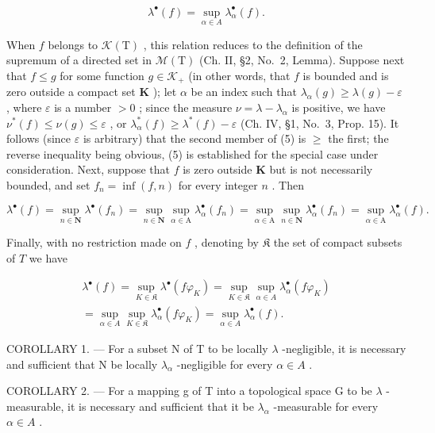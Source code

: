 \[
\lambda^ {\bullet} (f) = \sup _ {\alpha \in A} \lambda_ {\alpha} ^ {\bullet} (f).\tag{5}
\]

When \(f\) belongs to \(\mathcal{K}(\mathrm{T})\) , this relation reduces to the definition of the supremum of a directed set in \(\mathcal{M}(\mathrm{T})\) (Ch. II, §2, No.~2, Lemma). Suppose next that \(f \leqslant g\) for some function \(g \in \mathcal{K}_+\) (in other words, that \(f\) is bounded and is zero outside a compact set \(\mathbf{K}\) ); let \(\alpha\) be an index such that \(\lambda_{\alpha}(g) \geqslant \lambda(g) - \varepsilon\) , where \(\varepsilon\) is a number \(>0\) ; since the measure \(\nu = \lambda - \lambda_{\alpha}\) is positive, we have \(\nu^{*}(f) \leqslant \nu(g) \leqslant \varepsilon\) , or \(\lambda_{\alpha}^{*}(f) \geqslant \lambda^{*}(f) - \varepsilon\) (Ch. IV, §1, No.~3, Prop. 15). It follows (since \(\varepsilon\) is arbitrary) that the second member of (5) is \(\geqslant\) the first; the reverse inequality being obvious, (5) is established for the special case under consideration. Next, suppose that \(f\) is zero outside \(\mathbf{K}\) but is not necessarily bounded, and set \(f_n = \inf(f, n)\) for every integer \(n\) . Then

\[
\lambda^ {\bullet} (f) = \sup _ {n \in \mathbf {N}} \lambda^ {\bullet} (f _ {n}) = \sup _ {n \in \mathbf {N}} \sup _ {\alpha \in \mathrm{A}} \lambda_ {\alpha} ^ {\bullet} (f _ {n}) = \sup _ {\alpha \in \mathrm{A}} \sup _ {n \in \mathbf {N}} \lambda_ {\alpha} ^ {\bullet} (f _ {n}) = \sup _ {\alpha \in \mathrm{A}} \lambda_ {\alpha} ^ {\bullet} (f).
\]

Finally, with no restriction made on \(f\) , denoting by \(\mathfrak{K}\) the set of compact subsets of \(T\) we have

\[
\begin{array}{c} \lambda^ {\bullet} (f) = \sup _ {K \in \mathfrak {K}} \lambda^ {\bullet} (f \varphi_ {K}) = \sup _ {K \in \mathfrak {K}} \sup _ {\alpha \in A} \lambda_ {\alpha} ^ {\bullet} (f \varphi_ {K}) \\ = \sup _ {\alpha \in A} \sup _ {K \in \mathfrak {K}} \lambda_ {\alpha} ^ {\bullet} (f \varphi_ {K}) = \sup _ {\alpha \in A} \lambda_ {\alpha} ^ {\bullet} (f). \end{array}
\]

COROLLARY 1. --- For a subset N of T to be locally \(\lambda\) -negligible, it is necessary and sufficient that N be locally \(\lambda_{\alpha}\) -negligible for every \(\alpha \in A\) .

COROLLARY 2. --- For a mapping g of T into a topological space G to be \(\lambda\) -measurable, it is necessary and sufficient that it be \(\lambda_{\alpha}\) -measurable for every \(\alpha \in A\) .

